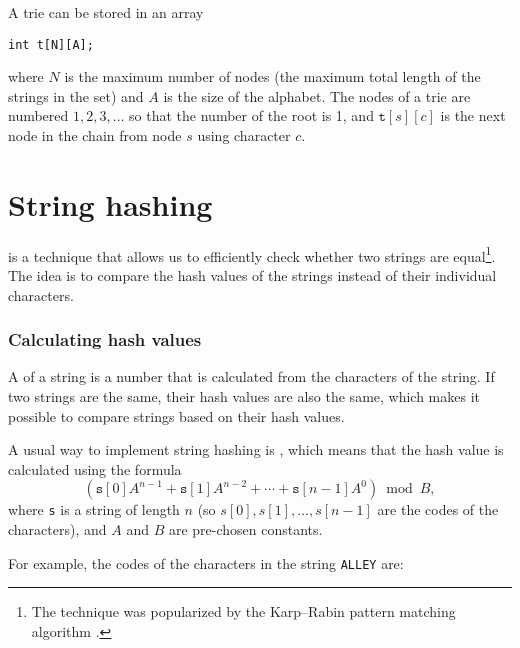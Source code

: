 A trie can be stored in an array
\begin{lstlisting}
int t[N][A];
\end{lstlisting}
where $N$ is the maximum number of nodes
(the maximum total length of the strings in the set)
and $A$ is the size of the alphabet.
The nodes of a trie are numbered
$1,2,3,\ldots$ so that the number of the root is 1,
and $\texttt{t}[s][c]$ is the next node in the chain
from node $s$ using character $c$.

\section{String hashing}


 is a technique that
allows us to efficiently check whether two
strings are equal\footnote{The technique
was popularized by the Karp–Rabin pattern matching
algorithm \cite{kar87}.}.
The idea is to compare the hash values of the
strings instead of their individual characters.

\subsubsection*{Calculating hash values}


A  of a string is
a number that is calculated from the characters
of the string.
If two strings are the same,
their hash values are also the same,
which makes it possible to compare strings
based on their hash values.

A usual way to implement string hashing
is , which means
that the hash value is calculated using the formula
\[(\texttt{s}[0] A^{n-1} + \texttt{s}[1] A^{n-2} + \cdots + \texttt{s}[n-1] A^0) \bmod B  ,\]
where \texttt{s} is a string of length $n$
(so $s[0],s[1],\ldots,s[n-1]$
are the codes of the characters),
and $A$ and $B$ are pre-chosen constants.

For example, the codes of the characters
in the string \texttt{ALLEY} are:
\begin{center}
\end{center}

